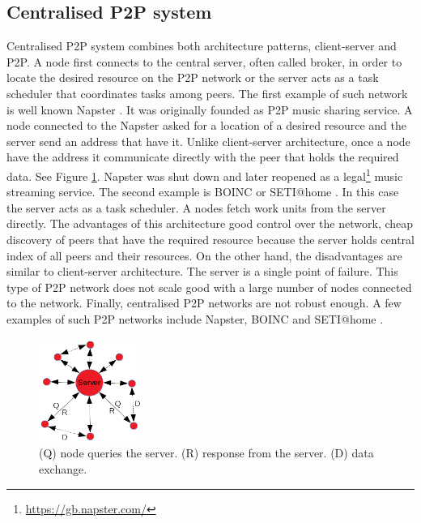 \subsection{Centralised P2P system}
\quad Centralised P2P system combines both architecture patterns, client-server and P2P. A node first connects to the central server, often called broker, in order to locate the desired resource on the P2P network or the server acts as a task scheduler that coordinates tasks among peers. The first example of such network is well known Napster \cite{noauthor_napster_2018}. It was originally founded as P2P music sharing service. A node connected to the Napster asked for a location of a desired resource and the server send an address that have it. Unlike client-server architecture, once a node have the address it communicate directly with the peer that holds the required data. See Figure \ref{fig:centralised-p2p}. Napster was shut down and later reopened as a legal\footnote{\url{https://gb.napster.com/}} music streaming service. The second example is BOINC \cite{noauthor_boincpapers_nodate} or SETI@home \cite{noauthor_setihome_nodate}. In this case the server acts as a task scheduler. A nodes fetch work units from the server directly. The advantages of this architecture good control over the network, cheap discovery of peers that have the required resource because the server holds central index of all peers and their resources. On the other hand, the disadvantages are similar to client-server architecture. The server is a single point of failure. This type of P2P network does not scale good with a large number of nodes connected to the network. Finally, centralised P2P networks are not robust enough. A few examples of such P2P networks include Napster\cite{noauthor_napster_2018}, BOINC \cite{noauthor_boincpapers_nodate} and SETI@home \cite{noauthor_setihome_nodate}.

\begin{figure}[ht]
	\centering
	\includegraphics[width=0.3\textwidth]{images/centralised-p2p.png}
	\caption{\label{fig:centralised-p2p}(Q) node queries the server. (R) response from the server. (D) data exchange.}
\end{figure}

